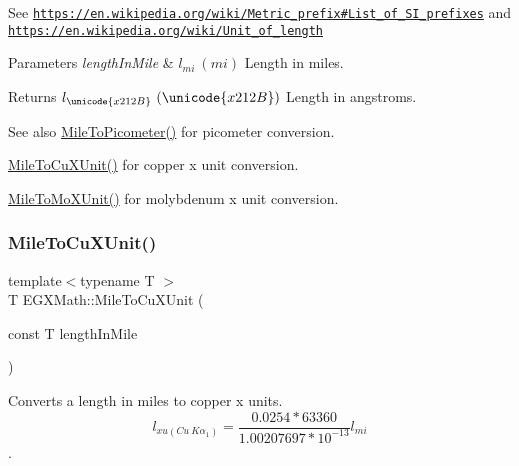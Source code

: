 See \href{https://en.wikipedia.org/wiki/Metric_prefix#List_of_SI_prefixes}{\tt https\+://en.\+wikipedia.\+org/wiki/\+Metric\+\_\+prefix\#\+List\+\_\+of\+\_\+\+S\+I\+\_\+prefixes} and \href{https://en.wikipedia.org/wiki/Unit_of_length}{\tt https\+://en.\+wikipedia.\+org/wiki/\+Unit\+\_\+of\+\_\+length} 
\begin{DoxyParams}{Parameters}
{\em length\+In\+Mile} & $ l_{mi}\ (mi)$ Length in miles. \\
\hline
\end{DoxyParams}
\begin{DoxyReturn}{Returns}
$ l_{\unicode{x212B}}\ (\unicode{x212B})$ Length in angstroms. 
\end{DoxyReturn}
\begin{DoxySeeAlso}{See also}
\mbox{\hyperlink{group___e_g_x_math-_conversions-_length_conversions-_imperial-_mile-_s_i_ga470a1271de988c28cb4851e5930d99da}{Mile\+To\+Picometer()}} for picometer conversion. 

\mbox{\hyperlink{group___e_g_x_math-_conversions-_length_conversions-_imperial-_mile-_non-_s_i_ga63bec635d857da530046d1c5a165b1d8}{Mile\+To\+Cu\+X\+Unit()}} for copper x unit conversion. 

\mbox{\hyperlink{group___e_g_x_math-_conversions-_length_conversions-_imperial-_mile-_non-_s_i_gadefb09bf42157adb9c7a458b93e3a851}{Mile\+To\+Mo\+X\+Unit()}} for molybdenum x unit conversion. 
\end{DoxySeeAlso}
\mbox{\label{group___e_g_x_math-_conversions-_length_conversions-_imperial-_mile-_non-_s_i_ga63bec635d857da530046d1c5a165b1d8}} 
\subsubsection{\texorpdfstring{Mile\+To\+Cu\+X\+Unit()}{MileToCuXUnit()}}
{\footnotesize\ttfamily template$<$typename T $>$ \\
T E\+G\+X\+Math\+::\+Mile\+To\+Cu\+X\+Unit (\begin{DoxyParamCaption}\item[{const T}]{length\+In\+Mile }\end{DoxyParamCaption})}



Converts a length in miles to copper x units. \[ l_{xu(Cu\ K\alpha_1)}=\frac{0.0254 * 63360}{1.00207697*10^{-13}} l_{mi}\]. 


